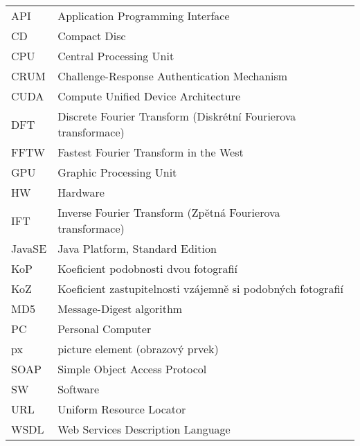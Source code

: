 
\seznamzkr

\begin{tabular}{ll}
  API		& Application Programming Interface									\\
  CD		& Compact Disc														\\
  CPU		& Central Processing Unit											\\
  CRUM		& Challenge-Response Authentication Mechanism						\\
  CUDA		& Compute Unified Device Architecture								\\
  DFT		& Discrete Fourier Transform (Diskrétní Fourierova transformace)	\\
  FFTW		& Fastest Fourier Transform in the West 							\\
  GPU		& Graphic Processing Unit											\\
  HW		& Hardware															\\
  IFT		& Inverse Fourier Transform (Zpětná Fourierova transformace)		\\
  JavaSE	& Java Platform, Standard Edition									\\
  KoP		& Koeficient podobnosti dvou fotografií								\\
  KoZ		& Koeficient zastupitelnosti vzájemně si podobných fotografií		\\
  MD5		& Message-Digest algorithm											\\
  PC		& Personal Computer													\\
  px		& picture element (obrazový prvek)									\\
  SOAP		& Simple Object Access Protocol										\\
  SW		& Software															\\
  URL		& Uniform Resource Locator											\\
  WSDL		& Web Services Description Language									\\
\end{tabular}

